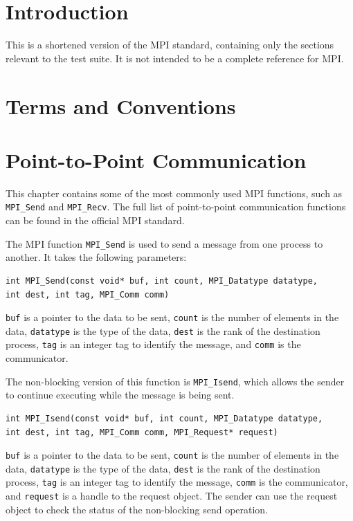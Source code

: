\documentclass[letterpaper]{report}
\begin{document}
\chapter{Introduction}

This is a shortened version of the MPI standard, containing only the sections
relevant to the test suite. It is not intended to be a complete reference for MPI.

\chapter{Terms and Conventions}

\chapter{Point-to-Point Communication}

This chapter contains some of the most commonly used MPI functions, such
as \texttt{MPI\_Send} and \texttt{MPI\_Recv}. The full list of point-to-point
communication functions can be found in the official MPI standard.

The MPI function \texttt{MPI\_Send} is used to send a message from one process to another.
It takes the following parameters:

\begin{verbatim}
int MPI_Send(const void* buf, int count, MPI_Datatype datatype,
int dest, int tag, MPI_Comm comm)
\end{verbatim}

\texttt{buf} is a pointer to the data to be sent, \texttt{count} is the number
of elements in the data, \texttt{datatype} is the type of the data,
\texttt{dest} is the rank of the destination process, \texttt{tag}
is an integer tag to identify the message, and \texttt{comm} is the communicator.

The non-blocking version of this function is \texttt{MPI\_Isend},
which allows the sender to continue executing while the message is being sent.

\begin{verbatim}
int MPI_Isend(const void* buf, int count, MPI_Datatype datatype,
int dest, int tag, MPI_Comm comm, MPI_Request* request)
\end{verbatim}

\texttt{buf} is a pointer to the data to be sent, \texttt{count} is the number
of elements in the data, \texttt{datatype} is the type of the data,
\texttt{dest} is the rank of the destination process, \texttt{tag}
is an integer tag to identify the message, \texttt{comm} is the communicator,
and \texttt{request} is a handle to the request object.
The sender can use the request object to check the status of the non-blocking send
operation.
\end{document}
